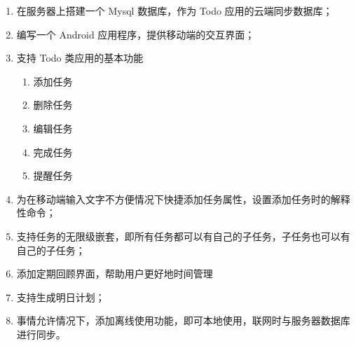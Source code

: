\begin{enumerate}
    \item 在服务器上搭建一个 Mysql 数据库，作为 Todo 应用的云端同步数据库；
    \item 编写一个 Android 应用程序，提供移动端的交互界面；
    \item 支持 Todo 类应用的基本功能
        \begin{enumerate}
            \item 添加任务
            \item 删除任务
            \item 编辑任务
            \item 完成任务
            \item 提醒任务
        \end{enumerate}
    \item 为在移动端输入文字不方便情况下快捷添加任务属性，设置添加任务时的解释性命令；
    \item 支持任务的无限级嵌套，即所有任务都可以有自己的子任务，子任务也可以有自己的子任务；
    \item 添加定期回顾界面，帮助用户更好地时间管理
    \item 支持生成明日计划；
    \item 事情允许情况下，添加离线使用功能，即可本地使用，联网时与服务器数据库进行同步。
\end{enumerate}
